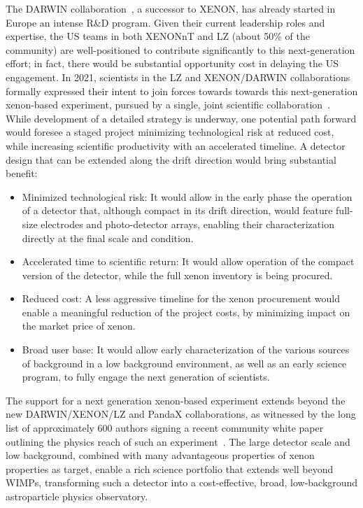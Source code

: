 The DARWIN collaboration~\cite{DARWIN:2016hyl}, a successor to XENON, has already started in Europe an intense R\&D program. Given their current leadership roles and expertise, the US teams in both XENONnT and LZ (about 50\% of the community) are well-positioned to contribute significantly to this next-generation effort; in fact, there would be substantial opportunity cost in delaying the US engagement. In 2021, scientists in the LZ and XENON/DARWIN collaborations formally expressed their intent to join forces towards towards this next-generation xenon-based experiment, pursued by a single, joint scientific collaboration~\cite{mou}. While development of a detailed strategy is underway, one potential path forward would foresee a staged project minimizing technological risk at reduced cost, while increasing scientific productivity with an accelerated timeline. A detector design that can be extended along the drift direction would bring substantial benefit:
\begin{itemize}
    \item Minimized technological risk: It would allow in the early phase the operation of a detector that, although compact in its drift direction, would feature full-size electrodes and photo-detector arrays, enabling their characterization directly at the final scale and condition.
    \item Accelerated time to scientific return: It would allow operation of the compact version of the detector, while the full xenon inventory is being procured. 
    \item Reduced cost: A less aggressive timeline for the xenon procurement would enable a meaningful reduction of the project costs, by minimizing impact on the market price of xenon.
    \item Broad user base: It would allow early characterization of the various sources of background in a low background environment, as well as an early science program, to fully engage the next generation of scientists. 
\end{itemize}

The support for a next generation xenon-based experiment extends beyond the new DARWIN/XENON/LZ and PandaX collaborations, as witnessed by the long list of approximately 600 authors signing a recent community white paper outlining the physics reach of such an experiment~\cite{whitepaper_on_the_arxiv_still_in_february}. The large detector scale and low background, combined with many advantageous properties of xenon properties as target, enable a rich science portfolio that extends well beyond WIMPs, transforming such a detector into a cost-effective, broad, low-background astroparticle physics observatory. 
